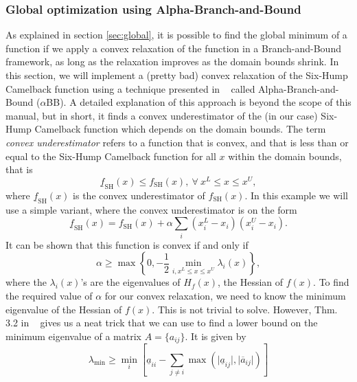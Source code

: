 \subsubsection{Global optimization using Alpha-Branch-and-Bound}
\label{sec:shcb_aBnB}
As explained in section \ref{sec:global}, it is possible to find the global minimum of a function if we apply a convex relaxation of the function in a Branch-and-Bound framework, as long as the relaxation improves as the domain bounds shrink. In this section, we will implement a (pretty bad) convex relaxation of the Six-Hump Camelback function using a technique presented in ~\cite{Adjiman19981137} called Alpha-Branch-and-Bound ($\alpha$BB). A detailed explanation of this approach is beyond the scope of this manual, but in short, it finds a convex underestimator of the (in our case) Six-Hump Camelback function which depends on the domain bounds. The term \emph{convex underestimator} refers to a function that is convex, and that is less than or equal to the Six-Hump Camelback function for all $x$ within the domain bounds, that is
\[
\underline{f}_{\mathrm{SH}}(x) \leq f_{\mathrm{SH}}(x), \: \forall \: x^L \leq x \leq x^U,
\]
where $\underline{f}_{\mathrm{SH}}(x)$ is the convex underestimator of $f_{\mathrm{SH}}(x)$. In this example we will use a simple variant, where the convex underestimator is on the form
\begin{equation}
\underline{f}_{\mathrm{SH}}(x) = f_{\mathrm{SH}}(x) + \alpha \sum_i (x_i^L - x_i)(x_i^U - x_i).
\end{equation}
It can be shown that this function is convex if and only if
\begin{equation}
\alpha \geq \max \left \lbrace 0, - \frac{1}{2} \min_{i, x^L \leq x \leq x^U} \lambda_i(x) \right \rbrace,
\label{eqn:alpha}
\end{equation}
where the $\lambda_i(x)$'s are the eigenvalues of $H_f(x)$, the Hessian of $f(x)$. To find the required value of $\alpha$ for our convex relaxation, we need to know the minimum eigenvalue of the Hessian of $f(x)$. This is not trivial to solve. However, Thm. 3.2 in ~\cite{Adjiman19981137} gives us a neat trick that we can use to find a lower bound on the minimum eigenvalue of a matrix $A = \lbrace a_{ij} \rbrace$. It is given by
\begin{equation}
\lambda_{\mathrm{min}} \geq \min_i \left[ \underline{a}_{ii} - \sum_{j \neq i} \max (\vert \underline{a}_{ij} \vert , \vert \overline{a}_{ij} \vert )\right]
\label{eqn:mineigenval}
\end{equation}
